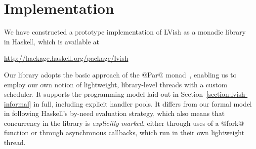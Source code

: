 \section{Implementation}\label{section:implementation}


We have constructed a prototype implementation of LVish as a monadic library in
Haskell, which is available at 
\begin{center}
\url{http://hackage.haskell.org/package/lvish}
\end{center}
%
Our library adopts the basic approach
of the @Par@ monad~\cite{monad-par}, enabling us to employ our own notion of
lightweight, library-level threads with a custom scheduler.  It supports the
programming model laid out in Section~\ref{section:lvish-informal} in full,
including explicit handler pools.  It differs from our formal model in following
Haskell's by-need evaluation strategy, which also means that concurrency in the
library is \emph{explicitly marked}, either through uses of a @fork@ function or
through asynchronous callbacks, which run in their own lightweight thread.

